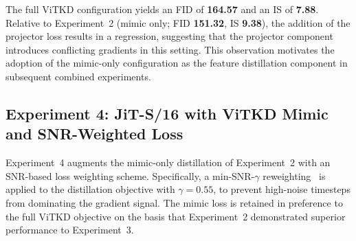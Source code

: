 The full ViTKD configuration yields an FID of \textbf{164.57} and an IS of
\textbf{7.88}. Relative to Experiment~2 (mimic only; FID \textbf{151.32},
IS \textbf{9.38}), the addition of the projector loss results in a
regression, suggesting that the projector component
introduces conflicting gradients in this
setting. This observation motivates the adoption of the mimic-only
configuration as the feature distillation component in subsequent
combined experiments.

\FloatBarrier

\subsection{Experiment 4: JiT-S/16 with ViTKD Mimic and SNR-Weighted Loss}
\label{subsec:exp4}

Experiment~4 augments the mimic-only distillation of Experiment~2 with
an SNR-based loss weighting scheme. Specifically, a min-SNR-$\gamma$
reweighting~\cite{hang2023efficient} is applied to the distillation objective with $\gamma = 0.55$, to prevent high-noise timesteps from
dominating the gradient signal. The mimic loss is retained in preference
to the full ViTKD objective on the basis that Experiment~2 demonstrated
superior performance to Experiment~3.

